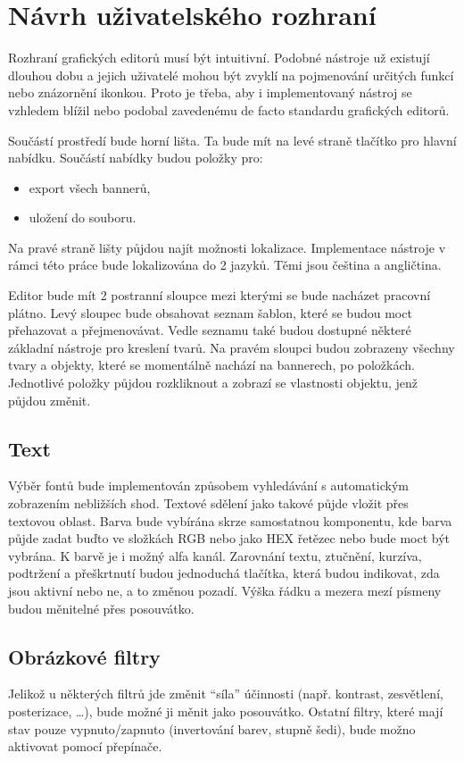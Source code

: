     \section{Návrh uživatelského rozhraní}
    Rozhraní grafických editorů musí být intuitivní. Podobné nástroje už existují dlouhou dobu a jejich uživatelé mohou být zvyklí na pojmenování určitých funkcí
    nebo znázornění ikonkou. Proto je třeba, aby i implementovaný nástroj se vzhledem blížil nebo podobal zavedenému de facto standardu grafických editorů. 

    Součástí prostředí bude horní lišta. Ta bude mít na levé straně tlačítko pro hlavní nabídku. Součástí nabídky budou položky pro:
    \begin{itemize}
        \item export všech bannerů,
        \item uložení do souboru.
    \end{itemize}
    Na pravé straně lišty půjdou najít možnosti lokalizace. Implementace nástroje v rámci této práce bude lokalizována do 2 jazyků. Těmi jsou čeština a angličtina. 

    Editor bude mít 2 postranní sloupce mezi kterými se bude nacházet pracovní plátno. Levý sloupec bude obsahovat seznam šablon,
    které se budou moct přehazovat a přejmenovávat. Vedle seznamu také budou dostupné některé základní nástroje pro kreslení tvarů.
    Na pravém sloupci budou zobrazeny všechny tvary a objekty, které se momentálně nachází na bannerech, po položkách.
    Jednotlivé položky půjdou rozkliknout a zobrazí se vlastnosti objektu, jenž půjdou změnit.

        \subsection{Text}
        Výběr fontů bude implementován způsobem vyhledávání s automatickým zobrazením nebližších shod.
        Textové sdělení jako takové půjde vložit přes textovou oblast. Barva bude vybírána skrze samostatnou komponentu, kde barva půjde zadat buďto
        ve složkách RGB nebo jako HEX řetězec nebo bude moct být vybrána. K barvě je i možný alfa kanál.
        Zarovnání textu, ztučnění, kurzíva, podtržení a přeškrtnutí budou jednoduchá tlačítka, která budou indikovat, zda jsou aktivní nebo ne,
        a to změnou pozadí. Výška řádku a mezera mezí písmeny budou měnitelné přes posouvátko.

        \subsection{Obrázkové filtry}
        Jelikož u některých filtrů jde změnit \enquote{síla} účinnosti (např. kontrast, zesvětlení, posterizace, \ldots), bude možné ji měnit jako posouvátko.
        Ostatní filtry, které mají stav pouze vypnuto/zapnuto (invertování barev, stupně šedi), bude možno aktivovat pomocí přepínače.


